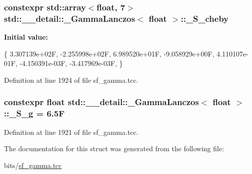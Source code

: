 \subsubsection[{\texorpdfstring{\+\_\+\+S\+\_\+cheby}{_S_cheby}}]{\setlength{\rightskip}{0pt plus 5cm}constexpr std\+::array$<$float, 7$>$ {\bf std\+::\+\_\+\+\_\+detail\+::\+\_\+\+Gamma\+Lanczos}$<$ float $>$\+::\+\_\+\+S\+\_\+cheby\hspace{0.3cm}{\ttfamily [static]}}\hypertarget{structstd_1_1____detail_1_1__GammaLanczos_3_01float_01_4_aef3020e056eda28af9d59f9f7f15bb96}{}\label{structstd_1_1____detail_1_1__GammaLanczos_3_01float_01_4_aef3020e056eda28af9d59f9f7f15bb96}
{\bfseries Initial value\+:}
\begin{DoxyCode}
\{
    3.307139e+02F,
    -2.255998e+02F,
    6.989520e+01F,
    -9.058929e+00F,
    4.110107e-01F,
    -4.150391e-03F,
    -3.417969e-03F,
      \}
\end{DoxyCode}


Definition at line 1924 of file sf\+\_\+gamma.\+tcc.

\subsubsection[{\texorpdfstring{\+\_\+\+S\+\_\+g}{_S_g}}]{\setlength{\rightskip}{0pt plus 5cm}constexpr float {\bf std\+::\+\_\+\+\_\+detail\+::\+\_\+\+Gamma\+Lanczos}$<$ float $>$\+::\+\_\+\+S\+\_\+g = 6.\+5F\hspace{0.3cm}{\ttfamily [static]}}\hypertarget{structstd_1_1____detail_1_1__GammaLanczos_3_01float_01_4_a76b72c5d8c5385cf17a304b136ff2600}{}\label{structstd_1_1____detail_1_1__GammaLanczos_3_01float_01_4_a76b72c5d8c5385cf17a304b136ff2600}


Definition at line 1921 of file sf\+\_\+gamma.\+tcc.



The documentation for this struct was generated from the following file\+:\begin{DoxyCompactItemize}
\item 
bits/\hyperlink{sf__gamma_8tcc}{sf\+\_\+gamma.\+tcc}\end{DoxyCompactItemize}
